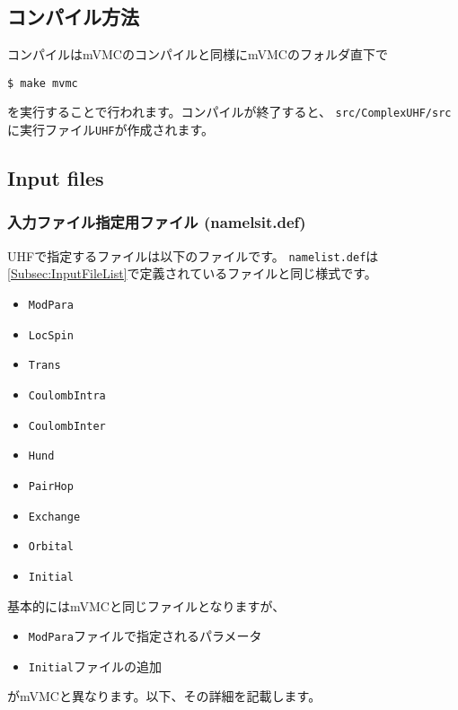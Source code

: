 \subsection{コンパイル方法}
コンパイルはmVMCのコンパイルと同様にmVMCのフォルダ直下で
\begin{verbatim}
$ make mvmc
\end{verbatim}
を実行することで行われます。コンパイルが終了すると、
\verb|src/ComplexUHF/src|に実行ファイル\verb|UHF|が作成されます。

\subsection{Input files}
\subsubsection{入力ファイル指定用ファイル (namelsit.def)}
UHFで指定するファイルは以下のファイルです。
\verb|namelist.def|は\ref{Subsec:InputFileList}で定義されているファイルと同じ様式です。\\
\begin{itemize}
\item{\verb|ModPara|}
\item{\verb|LocSpin|}
\item{\verb|Trans|}
\item{\verb|CoulombIntra|}
\item{\verb|CoulombInter|}
\item{\verb|Hund|}
\item{\verb|PairHop|}
\item{\verb|Exchange|}
\item{\verb|Orbital|}
\item{\verb|Initial|}
\end{itemize}
基本的にはmVMCと同じファイルとなりますが、
 \begin{itemize}
 \item{\verb|ModPara|ファイルで指定されるパラメータ}
 \item{\verb|Initial|ファイルの追加}
 \end{itemize}
がmVMCと異なります。以下、その詳細を記載します。


